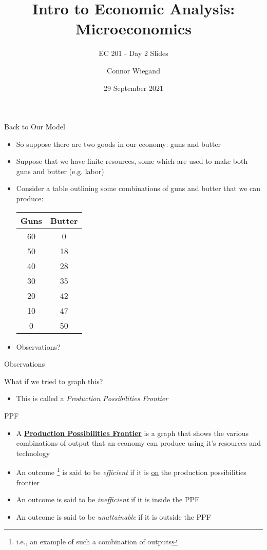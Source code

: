 \documentclass[10pt,xcolor={svgnames}]{beamer}
\title[Connor Wiegand]{Intro to Economic Analysis: Microeconomics}
\subtitle{EC 201 - Day 2 Slides}
\author[EC 201]{Connor Wiegand}
\institute[]{Department of Economics - University of Oregon}
\date{29 September 2021}
\begin{document}
\frame{\titlepage}

\begin{frame}{Back to Our Model}
    \begin{itemize}[<+->]
        \item So suppose there are two goods in our economy: guns and butter
        \item Suppose that we have finite resources, some which are used to make both guns and butter (e.g. labor) 
        \item Consider a table outlining some combinations of guns and butter that we can produce:
        \begin{table}[H]
            \centering
            \begin{tabular}{c|c}
                Guns & Butter  \\
                \hline
                60 & 0\\
                50 & 18\\
                40 & 28\\
                30 & 35\\
                20 & 42\\
                10 & 47\\
                0 & 50\\
            \end{tabular}
        \end{table}
        \item Observations?
    \end{itemize}
\end{frame}


\begin{frame}{Observations}

\end{frame}


\begin{frame}{What if we tried to graph this?}
\pause
\vspace{62mm}
\begin{itemize}
    \item This is called a \textit{Production Possibilities Frontier}
\end{itemize}
\end{frame}


\begin{frame}{PPF}
\begin{itemize}[<+->]
    \item A \underline{\textbf{Production Possibilities Frontier}} is a graph that shows the various combinations of output that an economy can produce using it's resources and technology
    \item An outcome \footnote{i.e., an example of such a combination of outputs} is said to be \textit{efficient} if it is \underline{on} the production possibilities frontier
    \item An outcome is said to be \textit{inefficient} if it is inside the PPF
    \item An outcome is said to be \textit{unattainable} if it is outside the PPF
\end{itemize}
\end{frame}
\end{document}
